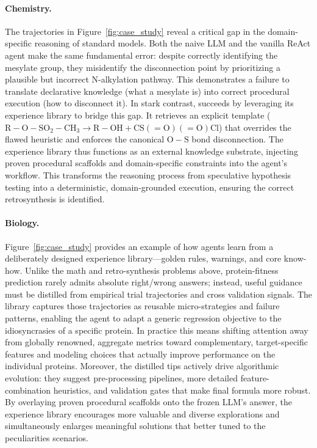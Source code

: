 \paragraph{Chemistry.} The trajectories in Figure~\ref{fig:case_study} reveal a critical gap in the domain-specific reasoning of standard models. Both the naive LLM and the vanilla ReAct agent make the same fundamental error: despite correctly identifying the mesylate group, they misidentify the disconnection point by prioritizing a plausible but incorrect N-alkylation pathway. This demonstrates a failure to translate declarative knowledge (what a mesylate is) into correct procedural execution (how to disconnect it). In stark contrast, \method{} succeeds by leveraging its experience library to bridge this gap. It retrieves an explicit template ($\mathrm{R{-}O{-}SO_2{-}CH_3} \rightarrow \mathrm{R{-}OH} + \mathrm{CS(=O)(=O)Cl}$) that overrides the flawed heuristic and enforces the canonical $\mathrm{O{-}S}$ bond disconnection. The experience library thus functions as an external knowledge substrate, injecting proven procedural scaffolds and domain-specific constraints into the agent's workflow. This transforms the reasoning process from speculative hypothesis testing into a deterministic, domain-grounded execution, ensuring the correct retrosynthesis is identified.

\paragraph{Biology.} Figure~\ref{fig:case_study} provides an example of how agents learn from a deliberately designed experience library—golden rules, warnings, and core know-how. Unlike the math and retro-synthesis problems above, protein-fitness prediction rarely admits absolute right/wrong answers; instead, useful guidance must be distilled from empirical trial trajectories and cross validation signals. The library captures those trajectories as reusable micro-strategies and failure patterns, enabling the agent to adapt a generic regression objective to the idiosyncrasies of a specific protein. In practice this means shifting attention away from globally renowned, aggregate metrics toward complementary, target-specific features and modeling choices that actually improve performance on the individual proteins. Moreover, the distilled tips actively drive algorithmic evolution: they suggest pre-processing pipelines, more detailed feature-combination heuristics, and validation gates that make final formula more robust. By overlaying proven procedural scaffolds onto the frozen LLM’s answer, the experience library encourages more valuable and diverse explorations and simultaneously enlarges meaningful solutions that better tuned to the peculiarities scenarios.